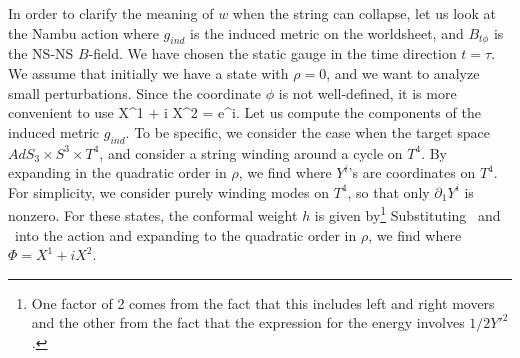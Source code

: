 In order to clarify the meaning of $w$ 
when the string can collapse, let us look at the Nambu action 
where $g_{ind}$ is the induced metric on the worldsheet,
and $B_{t\phi}$ is the NS-NS $B$-field. We have chosen the static 
gauge in the time direction $t=\tau$. 
We assume that initially we have a state with $\rho=0$, and we
want to analyze small perturbations. Since the coordinate
$\phi$ is not well-defined, it is more convenient to use
  {X^1 + i X^2 = \rho e^{i\phi}.}
Let us compute the components of the induced metric $g_{ind}$.
To be specific, we consider the case when the target space
$AdS_3 \times S^3 \times T^4$, and consider a string winding
around a cycle on $T^4$.  
By expanding in the quadratic order in $\rho$, we find
where $Y^i$'s are coordinates on $T^4$. For simplicity, we
consider purely winding modes on $T^4$, so that 
only $\partial_1 Y^i$ is nonzero. For these states, the conformal
weight $h$ is given by\footnote{One factor of 2 comes from the fact 
that this includes left and right
movers and the other from the fact that the expression for the energy
involves $1/2 {Y'}^2$.}
Substituting \sec\ and \enewind\ into the action and
expanding to the quadratic order in $\rho$, we find 
where $\Phi = X^1 + i X^2$. 

